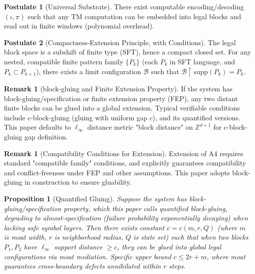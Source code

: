 \documentclass[12pt]{article}
\theoremstyle{plain}
\newtheorem{proposition}[theorem]{Proposition}
\theoremstyle{definition}
\newtheorem{remark}[theorem]{Remark}
\newtheorem{postulate}{Postulate}
\begin{document}
\begin{postulate}[Universal Substrate]
There exist computable encoding/decoding $(\iota, \pi)$ such that any TM computation can be embedded into legal blocks and read out in finite windows (polynomial overhead).
\end{postulate}

\begin{postulate}[Compactness-Extension Principle, with Conditions]
The legal block space is a subshift of finite type (SFT), hence a compact closed set. For any nested, compatible finite pattern family $\{P_k\}$ (each $P_k$ in SFT language, and $P_k \subset P_{k+1}$), there exists a limit configuration $\mathcal{B}$ such that $\mathcal{B} \upharpoonright \mathrm{supp}(P_k) = P_k$.
\end{postulate}

\begin{remark}[block-gluing and Finite Extension Property]
If the system has block-gluing/specification or finite extension property (FEP), any two distant finite blocks can be glued into a global extension. Typical verifiable conditions include c-block-gluing (gluing with uniform gap $c$), and its quantified versions. This paper defaults to $\ell_\infty$ distance metric "block distance" on $\mathbb{Z}^{d+1}$ for c-block-gluing gap definition.
\end{remark}

\begin{remark}[Compatibility Conditions for Extension]
Extension of A4 requires standard "compatible family" conditions, and explicitly guarantees compatibility and conflict-freeness under FEP and other assumptions. This paper adopts block-gluing in construction to ensure gluability.
\end{remark}

\begin{proposition}[Quantified Gluing]
Suppose the system has block-gluing/specification property, which this paper calls \emph{quantified block-gluing}, degrading to \emph{almost-specification} (failure probability exponentially decaying) when lacking safe symbol layers. Then there exists constant $c = c(m, r, Q)$ (where $m$ is moat width, $r$ is neighborhood radius, $Q$ is state set) such that when two blocks $P_1, P_2$ have $\ell_\infty$ support distance $\ge c$, they can be glued into global legal configurations via moat mediation. Specific upper bound $c \le 2r + m$, where moat guarantees cross-boundary defects annihilated within $r$ steps.
\end{proposition}
\end{document}
